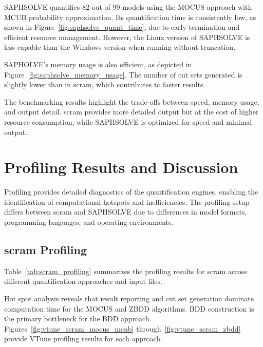 

SAPHSOLVE quantifies 82 out of 99 models using the MOCUS approach with MCUB probability approximation. Its quantification time is consistently low, as shown in Figure~\ref{fig:saphsolve_quant_time}, due to early termination and efficient resource management. However, the Linux version of SAPHSOLVE is less capable than the Windows version when running without truncation.



SAPHOLVE's memory usage is also efficient, as depicted in Figure~\ref{fig:saphsolve_memory_usage}. The number of cut sets generated is slightly lower than in scram, which contributes to faster results.



The benchmarking results highlight the trade-offs between speed, memory usage, and output detail. scram provides more detailed output but at the cost of higher resource consumption, while SAPHSOLVE is optimized for speed and minimal output.

\section{Profiling Results and Discussion}
Profiling provides detailed diagnostics of the quantification engines, enabling the identification of computational hotspots and inefficiencies. The profiling setup differs between scram and SAPHSOLVE due to differences in model formats, programming languages, and operating environments.

\subsection{scram Profiling}
Table~\ref{tab:scram_profiling} summarizes the profiling results for scram across different quantification approaches and input files.



Hot spot analysis reveals that result reporting and cut set generation dominate computation time for the MOCUS and ZBDD algorithms. BDD construction is the primary bottleneck for the BDD approach. Figures~\ref{fig:vtune_scram_mocus_mcub} through~\ref{fig:vtune_scram_zbdd} provide VTune profiling results for each approach.

